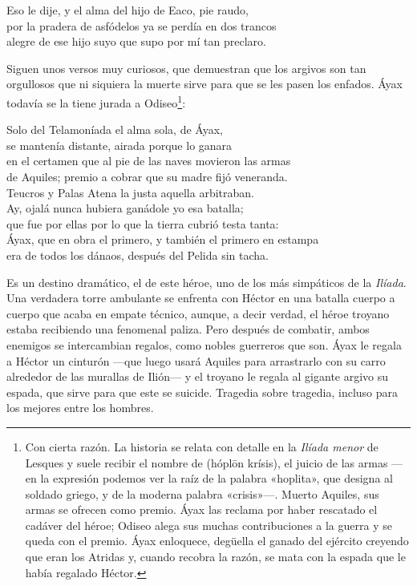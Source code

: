 \begin{versocita}
Eso le dije, y el alma del hijo de Eaco, pie raudo,\\
por la pradera de asfódelos ya se perdía en dos trancos\\
alegre de ese hijo suyo que supo por mí tan preclaro.
\end{versocita}

Siguen unos versos muy curiosos, que demuestran que los argivos son tan orgullosos que ni siquiera la muerte sirve para que se les pasen los enfados. Áyax todavía se la tiene jurada a Odiseo\footnote{Con cierta razón. La historia se relata con detalle en la \emph{Ilíada menor} de Lesques y suele recibir el nombre de  (hóplōn krísis), el juicio de las armas ---en la expresión podemos ver la raíz de la palabra «hoplita», que designa al soldado griego, y de la moderna palabra «crisis»---. Muerto Aquiles, sus armas se ofrecen como premio. Áyax las reclama por haber rescatado el cadáver del héroe; Odiseo alega sus muchas contribuciones a la guerra y se queda con el premio. Áyax enloquece, degüella el ganado del ejército creyendo que eran los Atridas y, cuando recobra la razón, se mata con la espada que le había regalado Héctor.}:


\begin{versocita}
Solo del Telamoníada el alma sola, de Áyax,\\
se mantenía distante, airada porque lo ganara\\
en el certamen que al pie de las naves movieron las armas\\
de Aquiles; premio a cobrar que su madre fijó veneranda.\\
Teucros y Palas Atena la justa aquella arbitraban.\\
Ay, ojalá nunca hubiera ganádole yo esa batalla;\\
que fue por ellas por lo que la tierra cubrió testa tanta:\\
Áyax, que en obra el primero, y también el primero en estampa\\
era de todos los dánaos, después del Pelida sin tacha.
\end{versocita}

Es un destino dramático, el de este héroe, uno de los más simpáticos de la \emph{Ilíada}. Una verdadera torre ambulante se enfrenta con Héctor en una batalla cuerpo a cuerpo que acaba en empate técnico, aunque, a decir verdad, el héroe troyano estaba recibiendo una fenomenal paliza. Pero después de combatir, ambos enemigos se intercambian regalos, como nobles guerreros que son. Áyax le regala a Héctor un cinturón ---que luego usará Aquiles para arrastrarlo con su carro alrededor de las murallas de Ilión--- y el troyano le regala al gigante argivo su espada, que sirve para que este se suicide. Tragedia sobre tragedia, incluso para los mejores entre los hombres.

